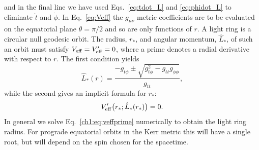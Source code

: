 and in the final line we have used Eqs.~\ref{eq:tdot_L} and \ref{eq:phidot_L} to eliminate $\dot{t}$ and $\dot{\phi}$.
In Eq.~\ref{eq:Veff} the $g_{\mu\nu}$ metric coefficients are to be evaluated on the equatorial plane $\theta=\pi/2$ and so are only functions of $r$.
A light ring is a circular null geodesic orbit. 
The radius, $r_*$, and angular momentum, $\hat{L}_*$, of such an orbit must satisfy $V_{\rm eff} = V'_{\rm eff} = 0$, where a prime denotes a radial derivative with respect to $r$. The first condition yields
\begin{equation}
	\hat{L}_*(r) = \frac{-g_{t \phi} \pm \sqrt{g_{t \phi}^2 - g_{t t}g_{\phi \phi}}}{g_{t t}},
\end{equation}
while the second gives an implicit formula for $r_*$:
\begin{equation}\label{ch1:eq:veffprime}
	V'_{\rm eff}\big(r_*;\hat{L}_*(r_*)\big) = 0.
\end{equation}
In general we solve Eq.~\ref{ch1:eq:veffprime} numerically to obtain the light ring radius.
For prograde equatorial orbits in the Kerr metric this will have a single root, but will depend on the spin chosen for the spacetime.

